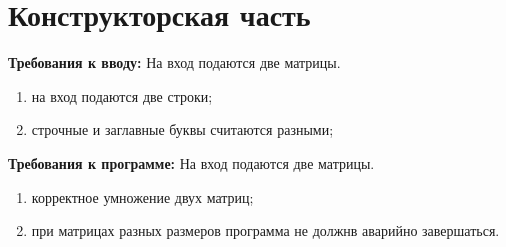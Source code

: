 \documentclass[a4paper, 12pt]{article}
\begin{document}
\newpage
\section{Конструкторская часть}
\begin{flushleft}
	{\bf Требования к вводу: } На вход подаются две матрицы.
	\begin{enumerate}
		\item на вход подаются две строки;
		\item строчные и заглавные буквы считаются разными;
	\end{enumerate}
		{\bf Требования к программе: } На вход подаются две матрицы.
	\begin{enumerate}
		\item корректное умножение двух матриц;
		\item при матрицах разных размеров программа не должнв аварийно завершаться. 
	\end{enumerate}


\end{flushleft}
\end{document}
